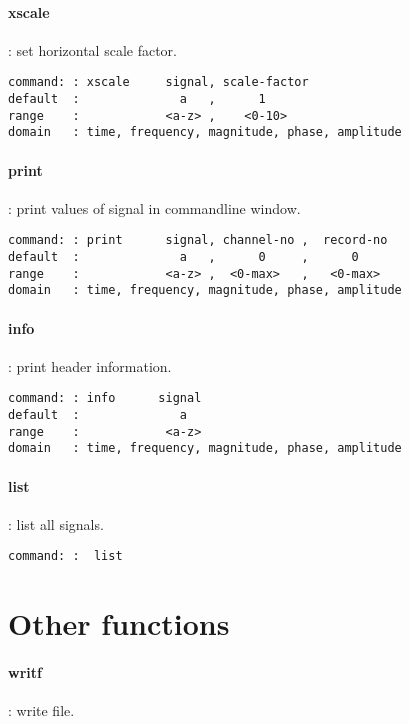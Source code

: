 \documentclass{report}
\newcommand{\bc}{\scriptsize}
\newcommand{\ec}{\normalsize}
\begin{document}
\paragraph{xscale}: set horizontal scale factor.

\bc
\begin{verbatim}
command: : xscale     signal, scale-factor
default  :              a   ,      1
range    :            <a-z> ,    <0-10>
domain   : time, frequency, magnitude, phase, amplitude
\end{verbatim}
\ec

\paragraph{print}: print values of signal in commandline window.

\bc
\begin{verbatim}
command: : print      signal, channel-no ,  record-no
default  :              a   ,      0     ,      0
range    :            <a-z> ,  <0-max>   ,   <0-max>
domain   : time, frequency, magnitude, phase, amplitude
\end{verbatim}
\ec

\paragraph{info}: print header information.

\bc
\begin{verbatim}
command: : info      signal
default  :              a   
range    :            <a-z> 
domain   : time, frequency, magnitude, phase, amplitude
\end{verbatim}
\ec

\paragraph{list}: list all signals.

\bc
\begin{verbatim}
command: :  list
\end{verbatim}
\ec

\section{Other functions}

\paragraph{writf}: write file.
\end{document}

